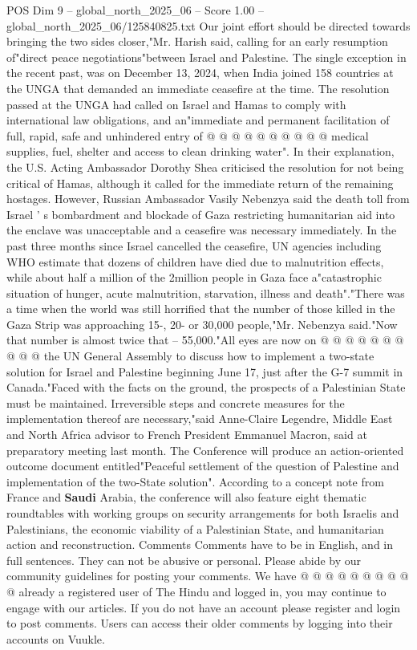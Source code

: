 \begin{textsample}{POS Dim 9 – global\_north\_2025\_06 – Score 1.00 – global\_north\_2025\_06/125840825.txt}
Our joint effort should be directed towards bringing the two sides closer,"Mr.
Harish said, calling for an early resumption of"direct peace negotiations"between Israel and Palestine.
The single exception in the recent past, was on December 13, 2024, when India joined 158 countries at the UNGA that demanded an immediate ceasefire at the time.
The resolution passed at the UNGA had called on Israel and Hamas to comply with international law obligations, and an"immediate and permanent facilitation of full, rapid, safe and unhindered entry of @ @ @ @ @ @ @ @ @ @ medical supplies, fuel, shelter and access to clean drinking water".
In their explanation, the U.S.
Acting Ambassador Dorothy Shea criticised the resolution for not being critical of Hamas, although it called for the immediate return of the remaining hostages.
However, Russian Ambassador Vasily Nebenzya said the death toll from Israel ' s bombardment and blockade of Gaza restricting humanitarian aid into the enclave was unacceptable and a ceasefire was necessary immediately.
In the past three months since Israel cancelled the ceasefire, UN agencies including WHO estimate that dozens of children have died due to malnutrition effects, while about half a million of the 2million people in Gaza face a"catastrophic situation of hunger, acute malnutrition, starvation, illness and death"."There was a time when the world was still horrified that the number of those killed in the Gaza Strip was approaching 15-, 20- or 30,000 people,"Mr.
Nebenzya said."Now that number is almost twice that -- 55,000."All eyes are now on @ @ @ @ @ @ @ @ @ @ the UN General Assembly to discuss how to implement a two-state solution for Israel and Palestine beginning June 17, just after the G-7 summit in Canada."Faced with the facts on the ground, the prospects of a Palestinian State must be maintained.
Irreversible steps and concrete measures for the implementation thereof are necessary,"said Anne-Claire Legendre, Middle East and North Africa advisor to French President Emmanuel Macron, said at preparatory meeting last month.
The Conference will produce an action-oriented outcome document entitled"Peaceful settlement of the question of Palestine and implementation of the two-State solution".
According to a concept note from France and \textbf{Saudi} Arabia, the conference will also feature eight thematic roundtables with working groups on security arrangements for both Israelis and Palestinians, the economic viability of a Palestinian State, and humanitarian action and reconstruction.
Comments Comments have to be in English, and in full sentences.
They can not be abusive or personal.
Please abide by our community guidelines for posting your comments.
We have @ @ @ @ @ @ @ @ @ @ already a registered user of The Hindu and logged in, you may continue to engage with our articles.
If you do not have an account please register and login to post comments.
Users can access their older comments by logging into their accounts on Vuukle.

\end{textsample}
